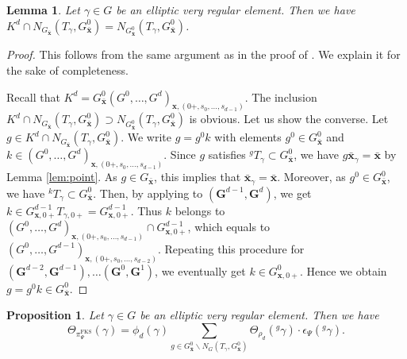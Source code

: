 \documentclass{amsart}
\newcommand{\FKS}{\mathrm{FKS}}
\newcommand{\x}{\mathbf{x}}
\newcommand{\bfG}{\mathbf{G}}
\theoremstyle{plain}
\newtheorem{prop}[thm]{Proposition}
\newtheorem{lem}[thm]{Lemma}
\theoremstyle{definition}
\theoremstyle{remark}
\theoremstyle{theorem}
\begin{document}
\begin{lem}\label{lem:Weyl2}
Let $\gamma\in G$ be an elliptic very regular element.
Then we have $K^{d}\cap N_{G_{\bar{\x}}}(T_{\gamma},G^{0}_{\bar{\x}})=N_{G^{0}_{\bar{\x}}}(T_{\gamma},G^{0}_{\bar{\x}})$.
\end{lem}

\begin{proof}
This follows from the same argument as in the proof of \cite[Lemma 4.10]{CO21}.
We explain it for the sake of completeness.

Recall that $K^{d}=G^{0}_{\bar{\x}}(G^{0},\ldots,G^{d})_{\x,(0+,s_{0},\ldots,s_{d-1})}$.
The inclusion $K^{d}\cap N_{G_{\bar{\x}}}(T_{\gamma},G^{0}_{\bar{\x}})\supset N_{G^{0}_{\bar{\x}}}(T_{\gamma},G^{0}_{\bar{\x}})$ is obvious.
Let us show the converse.
Let $g\in K^{d}\cap N_{G_{\bar{\x}}}(T_{\gamma},G^{0}_{\bar{\x}})$.
We write $g=g^{0}k$ with elements $g^{0}\in G^{0}_{\bar{\x}}$ and $k\in(G^{0},\ldots,G^{d})_{\x,(0+,s_{0},\ldots,s_{d-1})}$.
Since $g$ satisfies ${}^{g}T_{\gamma}\subset G^{0}_{\bar{\x}}$, we have $g\bar{\x}_{\gamma}=\bar{\x}$ by Lemma \ref{lem:point}.
As $g\in G_{\bar{\x}}$, this implies that $\bar{\x}_{\gamma}=\bar{\x}$.
Moreover, as $g^{0}\in G^{0}_{\bar{\x}}$, we have ${}^{k}T_{\gamma}\subset G^{0}_{\bar{\x}}$.
Then, by applying \cite[Lemma 9.10]{AS08} to $(\bfG^{d-1},\bfG^{d})$, we get $k\in G^{d-1}_{\x,0+}T_{\gamma,0+}=G^{d-1}_{\x,0+}$.
Thus $k$ belongs to $(G^{0},\ldots,G^{d})_{\x,(0+,s_{0},\ldots,s_{d-1})}\cap G^{d-1}_{\x,0+}$, which equals to $(G^{0},\ldots,G^{d-1})_{\x,(0+,s_{0},\ldots,s_{d-2})}$.
Repeating this procedure for $(\bfG^{d-2},\bfG^{d-1}),\ldots(\bfG^{0},\bfG^{1})$, we eventually get $k\in G^{0}_{\x,0+}$.
Hence we obtain $g=g^{0}k\in G^{0}_{\bar{\x}}$.
\end{proof}


\begin{prop}\label{prop:CF1}
Let $\gamma \in G$ be an elliptic very regular element.
Then we have
\[
\Theta_{\pi^{\FKS}_{\Psi}}(\gamma)
=
\phi_{d}(\gamma)\sum_{g \in G^{0}_{\bar{\x}}\backslash N_{G}(T_{\gamma},G^{0}_{\bar{\x}})} \Theta_{\rho_{d}}({}^{g}\gamma)\cdot\epsilon_{\Psi}({}^{g}\gamma).
\]
\end{prop}
\end{document}
